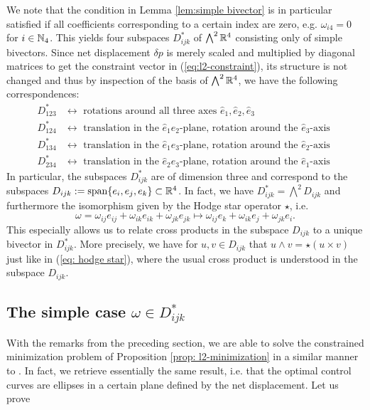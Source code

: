 We note that the condition in Lemma \ref{lem:simple bivector} is in particular satisfied if all coefficients corresponding to a certain index are zero, e.g. $\omega_{i4} = 0$ for $i \in \mathbb{N}_4$. This yields four subspaces $D^*_{ijk}$ of $\bigwedge^2 \mathbb{R}^4$ consisting only of simple bivectors. Since net displacement $\delta p$ is merely scaled and multiplied by diagonal matrices to get the constraint vector in (\ref{eq:l2-constraint}), its structure is not changed and thus by inspection of the basis of $\bigwedge^2 \mathbb{R}^4$, we have the following correspondences:
\begin{align*}
D^{*}_{123} &\longleftrightarrow\text{ rotations around all three axes } \hat{e}_1, \hat{e}_2, \hat{e}_3\\
D^{*}_{124} &\longleftrightarrow \text{ translation in the $\hat{e}_1\hat{e}_2$-plane, rotation around the $\hat{e}_3$-axis }\\
D^{*}_{134} &\longleftrightarrow  \text{ translation in the $\hat{e}_1\hat{e}_3$-plane, rotation around the $\hat{e}_2$-axis }\\
D^{*}_{234} &\longleftrightarrow  \text{ translation in the $\hat{e}_2\hat{e}_3$-plane, rotation around the $\hat{e}_1$-axis }
\end{align*}
In particular, the subspaces $D^{*}_{ijk}$ are of dimension three and correspond to the subspaces $D_{ijk} := \operatorname{span}\{e_i, e_j, e_k\} \subset \mathbb{R}^4$. In fact, we have $D^{*}_{ijk} = \bigwedge^2 D_{ijk}$ and furthermore the isomorphism given by the Hodge star operator $\star$, i.e.
\begin{equation}
\omega = \omega_{ij} e_{ij} + \omega_{ik} e_{ik} + \omega_{jk} e_{jk} \mapsto \omega_{ij} e_k + \omega_{ik} e_j + \omega_{jk} e_i.
\end{equation}
This especially allows us to relate cross products in the subspace $D_{ijk}$ to a unique bivector in $D_{ijk}^*$. More precisely, we have for $u, v \in D_{ijk}$ that $u \wedge v = \star(u \times v)$ just like in (\ref{eq: hodge star}), where the usual cross product is understood in the subspace $D_{ijk}$.

\subsection[The simple case]{The simple case $\omega \in D_{ijk}^*$}
With the remarks from the preceding section, we are able to solve the constrained minimization problem of Proposition \ref{prop: l2-minimization} in a similar manner to \cite{Alouges2017}. In fact, we retrieve essentially the same result, i.e. that the optimal control curves are ellipses in a certain plane defined by the net displacement. Let us prove

